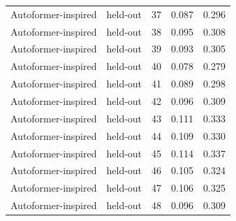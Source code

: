 \begin{tabular}{llrrr}
Autoformer-inspired & held-out & 37 & 0.087 & 0.296 \\
Autoformer-inspired & held-out & 38 & 0.095 & 0.308 \\
Autoformer-inspired & held-out & 39 & 0.093 & 0.305 \\
Autoformer-inspired & held-out & 40 & 0.078 & 0.279 \\
Autoformer-inspired & held-out & 41 & 0.089 & 0.298 \\
Autoformer-inspired & held-out & 42 & 0.096 & 0.309 \\
Autoformer-inspired & held-out & 43 & 0.111 & 0.333 \\
Autoformer-inspired & held-out & 44 & 0.109 & 0.330 \\
Autoformer-inspired & held-out & 45 & 0.114 & 0.337 \\
Autoformer-inspired & held-out & 46 & 0.105 & 0.324 \\
Autoformer-inspired & held-out & 47 & 0.106 & 0.325 \\
Autoformer-inspired & held-out & 48 & 0.096 & 0.309 \\
\bottomrule
\end{tabular}
